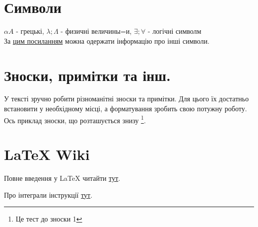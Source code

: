 \section{Символи}
$\alpha A$ - грецькі,  $ \lambda; \Lambda$ - физичні величины=и, $\exists; \forall$ - логічні символм\\
За \href{https://www.overleaf.com/learn/latex/List_of_Greek_letters_and_math_symbols}{цим посиланням} можна одержати інформацію про інші символи. 

\section{Зноски, примітки та інш.}
У тексті зручно робити різноманітні зноски та примітки. Для цього їх достатньо встановити у необхідному місці, а форматування зробить свою потужну роботу. Ось приклад зноски, що розташується знизу \footnote{Це тест до зноски 1}. 

\section{LaTeX Wiki}
Повне введення у LaTeX читайти \href{https://www.texlive.info/CTAN/info/lshort/russian/lshortru.pdf}{тут}.

Про інтеграли інструкції 
\href{https://www.overleaf.com/learn/latex/Integrals,_sums_and_limits#Integrals}{тут}.



